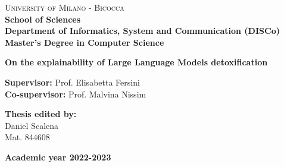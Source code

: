 \begin{titlepage}
    
    \noindent
    \begin{minipage}[t]{0.19\textwidth}
    \end{minipage}
    \begin{minipage}[t]{0.81\textwidth}
    {
            {\textsc{University of Milano - Bicocca}} \\
            \textbf{School of Sciences} \\
            \textbf{Department of Informatics, System and Communication (DISCo)} \\
            \textbf{Master’s Degree in Computer Science} \\
            \par
    }
    \end{minipage}
    
\vspace{40mm}
    
\begin{center}
        {\LARGE{
                \textbf{On the explainability of Large Language Models detoxification}
                \par
        }}
    \end{center}
    
    \vspace{25mm}
    
    \noindent
    {\large \textbf{Supervisor:} Prof. Elisabetta Fersini} \\

    \noindent
    {\large \textbf{Co-supervisor:} Prof. Malvina Nissim}
    
    \vspace{15mm}

    \begin{flushright}
        {\large \textbf{Thesis edited by:}} \\
        \large{Daniel Scalena} \\
        \large{Mat. 844608} 
    \end{flushright}
    
    \vspace{20mm}
    
    \begin{center}
        {\large{\bf Academic year 2022-2023}}
    \end{center}

    \restoregeometry
    
\end{titlepage}


